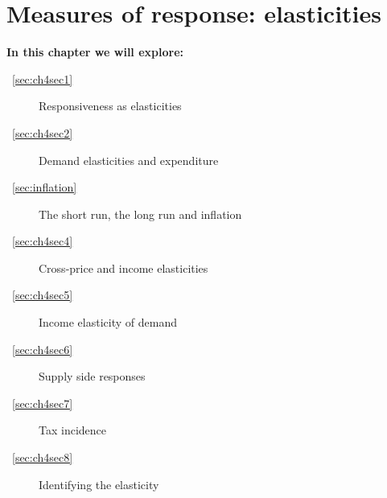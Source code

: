 \chapter{Measures of response: elasticities} \label{chap:elasticities}

\begin{topics}
\textbf{In this chapter we will explore:}
\begin{description}
\item [~\ref{sec:ch4sec1}] Responsiveness as elasticities
\item [~\ref{sec:ch4sec2}] Demand elasticities and expenditure
\item [~\ref{sec:inflation}] The short run, the long run and inflation
\item [~\ref{sec:ch4sec4}] Cross-price and income elasticities
\item [~\ref{sec:ch4sec5}] Income elasticity of demand
\item [~\ref{sec:ch4sec6}] Supply side responses
\item [~\ref{sec:ch4sec7}] Tax incidence
\item [~\ref{sec:ch4sec8}] Identifying the elasticity
\end{description}
\end{topics}